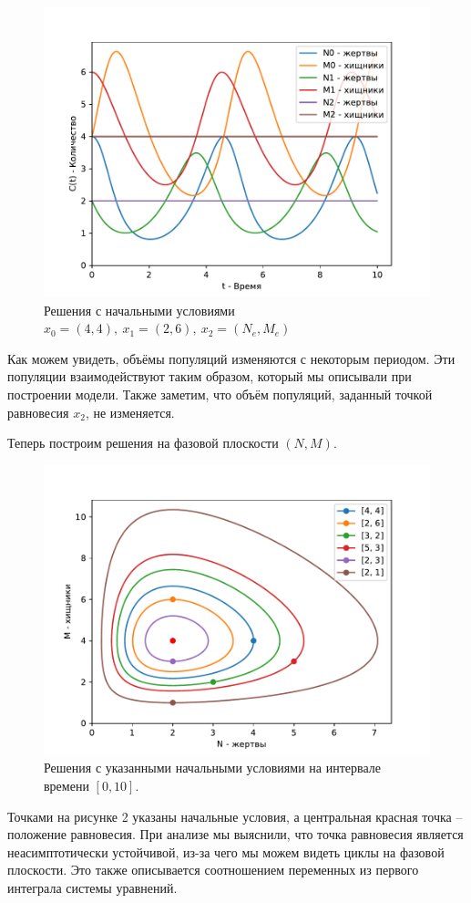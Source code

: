         \begin{figure}[H]
            \centering
            \includegraphics[width=15cm]{pictures/population.pdf}
            \caption{Решения с начальными условиями $x_0=(4,4), ~ x_1 = (2,6), ~ x_2 = (N_e, M_e)$}
        \end{figure}
        Как можем увидеть, объёмы популяций изменяются с некоторым периодом. Эти популяции взаимодействуют таким образом, который мы описывали при построении модели. Также заметим, что объём популяций, заданный точкой равновесия $ x_2 $, не изменяется.


        Теперь построим решения на фазовой плоскости $ (N, M) $.
        \begin{figure}[H]
            \centering
            \includegraphics[width=15cm]{pictures/population3.pdf}
            \caption{Решения с указанными начальными условиями на интервале времени $ [0, 10] $.}
        \end{figure}
        Точками на рисунке 2 указаны начальные условия, а центральная красная точка -- положение равновесия.
        При анализе мы выяснили, что точка равновесия является неасимптотически устойчивой, из-за чего мы можем видеть циклы на фазовой плоскости. Это также описывается соотношением переменных из первого интеграла системы уравнений.


